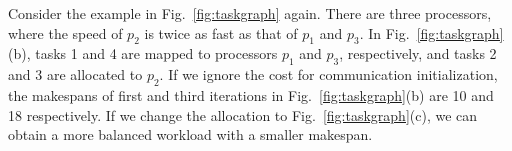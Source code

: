 Consider the example in Fig.~\ref{fig:taskgraph} again. There are three processors, where the speed of $p_2$ is twice as fast as that of $p_1$ and $p_3$.  
In Fig.~\ref{fig:taskgraph}(b),
tasks 1 and 4 are mapped to processors $p_1$ and $p_3$, respectively, and tasks 2 and 3 are allocated to $p_2$.
If we ignore the cost for communication initialization, the makespans of first and third iterations in Fig.~\ref{fig:taskgraph}(b) are 10 and 18 respectively. If we change the allocation to Fig.~\ref{fig:taskgraph}(c), we can obtain a more balanced workload with a smaller makespan.
